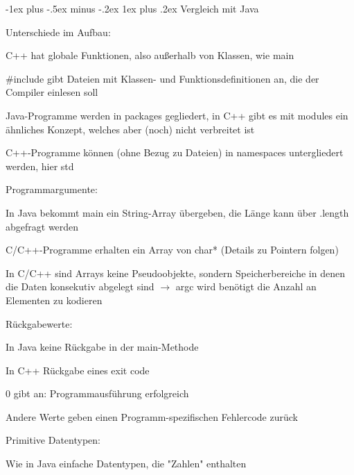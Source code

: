 \documentclass[10pt]{article}
\makeatletter
\renewcommand{\subsubsection}{\@startsection{subsubsection}{3}{0mm}%
                                {-1ex plus -.5ex minus -.2ex}%
                                {1ex plus .2ex}%
                                {\normalfont\small\bfseries}}
\makeatother
\begin{document}
\begin{itemize*}
\subsubsection{Vergleich mit Java}
\begin{itemize*}
  \item Unterschiede im Aufbau:
  \begin{itemize*}
    \item C++ hat globale Funktionen, also außerhalb von Klassen, wie main
    \item \#include gibt Dateien mit Klassen- und Funktionsdefinitionen an, die der Compiler einlesen soll
    \item Java-Programme werden in packages gegliedert, in C++ gibt es mit modules ein ähnliches Konzept, welches aber (noch) nicht verbreitet ist
    \item C++-Programme können (ohne Bezug zu Dateien) in namespaces untergliedert werden, hier std
  \end{itemize*}
  \item Programmargumente:
  \begin{itemize*}
    \item In Java bekommt main ein String-Array übergeben, die Länge kann über .length abgefragt werden
    \item C/C++-Programme erhalten ein Array von char* (Details zu Pointern folgen)
    \item In C/C++ sind Arrays keine Pseudoobjekte, sondern Speicherbereiche in denen die Daten konsekutiv abgelegt sind $\rightarrow$ argc wird benötigt die Anzahl an Elementen zu kodieren
  \end{itemize*}
  \item Rückgabewerte:
  \begin{itemize*}
    \item In Java keine Rückgabe in der main-Methode
    \item In C++ Rückgabe eines exit code
    \begin{itemize*}
      \item 0 gibt an: Programmausführung erfolgreich
      \item Andere Werte geben einen Programm-spezifischen Fehlercode zurück
    \end{itemize*}
  \end{itemize*}
  \item Primitive Datentypen:
  \begin{itemize*}
    \item Wie in Java einfache Datentypen, die "Zahlen" enthalten

\end{itemize*}
\end{itemize*}
\end{itemize*}
\end{document}
